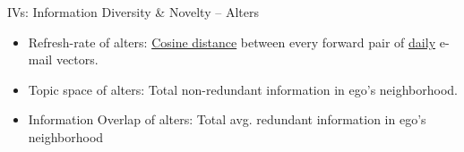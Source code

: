 \begin{frame}{{\color{violet}IVs: Information Diversity \& {\color{salmon}Novelty} -- Alters}}

  \begin{itemize}
    \item Refresh-rate of alters: \underline{Cosine distance} between every forward pair of \underline{daily} e-mail vectors.
    \item Topic space of alters: Total {\color{salmon}non-redundant} information in ego's neighborhood.
    \item Information Overlap of alters: Total avg. {\color{salmon}redundant} information in ego's neighborhood
  \end{itemize}

\end{frame}
